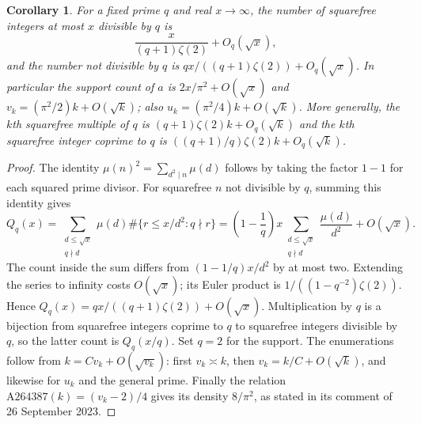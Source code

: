 \documentclass[11pt]{article}
\newtheorem{corollary}[theorem]{Corollary}
\begin{document}
\begin{samepage}
\begin{corollary}\label{cor:density}
For a fixed prime $q$ and real $x\to\infty$, the number of squarefree
integers at most $x$ divisible by $q$ is
\[
 \frac{x}{(q+1)\zeta(2)}+O_q(\sqrt{x}),
\]
and the number not divisible by $q$ is
$qx/((q+1)\zeta(2))+O_q(\sqrt{x})$.
In particular the support count of $a$ is
$2x/\pi^2+O(\sqrt{x})$ and
$v_k=(\pi^2/2)k+O(\sqrt{k})$; also
$u_k=(\pi^2/4)k+O(\sqrt{k})$.
More generally, the $k$th squarefree multiple of $q$ is
$(q+1)\zeta(2)k+O_q(\sqrt{k})$ and the $k$th squarefree integer
coprime to $q$ is $((q+1)/q)\zeta(2)k+O_q(\sqrt{k})$.
\end{corollary}
\end{samepage}
\begin{proof}
The identity $\mu(n)^2=\sum_{d^2\mid n}\mu(d)$ follows by taking
the factor $1-1$ for each squared prime divisor.
For squarefree $n$ not divisible by $q$, summing this identity gives
\[
 Q_q(x)=\sum_{\substack{d\leq\sqrt{x}\\q\nmid d}}\mu(d)
  \#\{r\leq x/d^2:q\nmid r\}
 =\left(1-\frac1q\right)x
  \sum_{\substack{d\leq\sqrt{x}\\q\nmid d}}\frac{\mu(d)}{d^2}
  +O(\sqrt{x}).
\]
The count inside the sum differs from $(1-1/q)x/d^2$ by at most two.
Extending the series to infinity costs $O(\sqrt{x})$; its Euler
product is $1/((1-q^{-2})\zeta(2))$.
Hence $Q_q(x)=qx/((q+1)\zeta(2))+O(\sqrt{x})$.
Multiplication by $q$ is a bijection from squarefree integers coprime
to $q$ to squarefree integers divisible by $q$, so the latter count
is $Q_q(x/q)$. Set $q=2$ for the support. The enumerations follow
from $k=Cv_k+O(\sqrt{v_k})$: first $v_k\asymp k$, then
$v_k=k/C+O(\sqrt{k})$, and likewise for $u_k$ and the general prime.
Finally the relation $\mathrm{A264387}(k)=(v_k-2)/4$ gives its
density $8/\pi^2$, as stated in its comment of 26 September 2023.
\end{proof}
\end{document}
